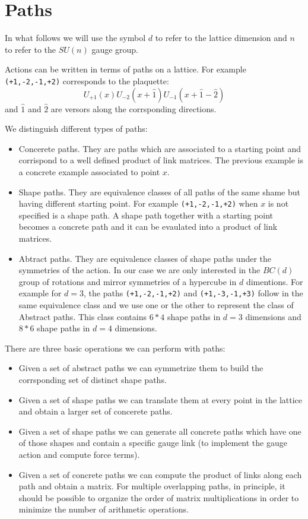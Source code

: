 \documentclass[12pt]{article}
\def\ft{\small\tt}
\begin{document}
\section{Paths}

In what follows we will use the symbol $d$ to refer to the lattice dimension and $n$ to refer to the $SU(n)$ gauge group.

Actions can be written in terms of paths on a lattice.
For example {\ft (+1,-2,-1,+2)} corresponds to the plaquette:
\begin{equation}
U_{+1}(x)U_{-2}(x+\hat{1})U_{-1}(x+\hat{1}-\hat{2})
\end{equation}
and $\hat{1}$ and $\hat{2}$ are versors along the corrsponding directions.

We distinguish different types of paths:
\begin{itemize}
\item Concerete paths. They are paths which are associated to a starting point and corrispond to a well defined product of link matrices. The previous example is a concrete example associated to point $x$.
\item Shape paths. They are equivalence classes of all paths of the same shame but having different starting point. For example {\ft (+1,-2,-1,+2)} when $x$ is not specified is a shape path. A shape path together with a starting point becomes a concrete path and it can be evaulated into a product of link matrices.
\item Abtract paths. They are equivalence classes of shape paths under the symmetries of the action. In our case we are only interested in the $BC(d)$ group of rotations and mirror symmetries of a hypercube in $d$ dimentions. For example for $d=3$, the paths {\ft (+1,-2,-1,+2)} and {\ft (+1,-3,-1,+3)} follow in the same equivalence class and we use one or the other to represent the class of Abstract paths. This class contains $6*4$ shape paths in $d=3$ dimensions and $8*6$ shape paths in $d=4$ dimensions.
\end{itemize}
There are three basic operations we can perform with paths:
\begin{itemize}
\item Given a set of abstract paths we can symmetrize them to build the corrsponding set of distinct shape paths.
\item Given a set of shape paths we can translate them at every point in the lattice and obtain a larger set of concerete paths.
\item Given a set of shape paths we can generate all concrete paths which have one of those shapes and contain a specific gauge link (to implement the gauge action and compute force terms).
\item Given a set of concrete paths we can compute the product of links along each path and obtain a matrix. For multiple overlapping paths, in principle, it should be possible to organize the order of matrix multiplications in order to minimize the number of arithmetic operations.
\end{itemize}
\end{document}
